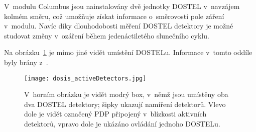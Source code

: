 V~modulu Columbus jsou nainstalovány dvě jednotky DOSTEL v~navzájem kolmém směru, což umožňuje získat informace o~směrovosti pole záření v~modulu. Navíc díky dlouhodobosti měření DOSTEL detektory je možné studovat změny v~ozáření během jedenáctiletého slunečního cyklu.

Na obrázku~\ref{fig:dosis_activeDetectors} je mimo jiné vidět umístění DOSTELu. Informace v~tomto oddíle byly brány z~\cite{dosis,activeDetectors}. 
\begin{figure}[H]
  \centering
  \texttt{[image: dosis\_activeDetectors.jpg]}
  \caption{V~horním obrázku je vidět modrý box, v~němž jsou umístěny oba dva DOSTEL detektory; šipky ukazují namíření detektorů. Vlevo dole je vidět označený PDP připojený v~blízkosti aktivních detektorů, vpravo dole je ukázáno ovládání jednoho DOSTELu.~\cite{dosis2}}
  \label{fig:dosis_activeDetectors}
\end{figure}



